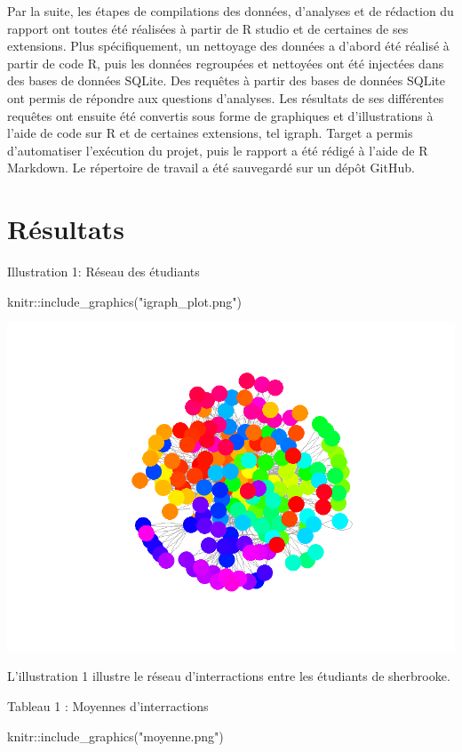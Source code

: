 \documentclass[9pt,twocolumn,twoside,]{pnas-new}
\newenvironment{Shaded}{\begin{snugshade}}{\end{snugshade}}
\newcommand{\FunctionTok}[1]{\textcolor[rgb]{0.00,0.00,0.00}{#1}}
\newcommand{\NormalTok}[1]{#1}
\newcommand{\SpecialCharTok}[1]{\textcolor[rgb]{0.00,0.00,0.00}{#1}}
\newcommand{\StringTok}[1]{\textcolor[rgb]{0.31,0.60,0.02}{#1}}
\begin{document}
Par la suite, les étapes de compilations des données, d'analyses et de
rédaction du rapport ont toutes été réalisées à partir de R studio et de
certaines de ses extensions. Plus spécifiquement, un nettoyage des
données a d'abord été réalisé à partir de code R, puis les données
regroupées et nettoyées ont été injectées dans des bases de données
SQLite. Des requêtes à partir des bases de données SQLite ont permis de
répondre aux questions d'analyses. Les résultats de ses différentes
requêtes ont ensuite été convertis sous forme de graphiques et
d'illustrations à l'aide de code sur R et de certaines extensions, tel
igraph. Target a permis d'automatiser l'exécution du projet, puis le
rapport a été rédigé à l'aide de R Markdown. Le répertoire de travail a
été sauvegardé sur un dépôt GitHub.

\hypertarget{ruxe9sultats}{%
\section{Résultats}\label{ruxe9sultats}}

Illustration 1: Réseau des étudiants

\begin{Shaded}
\begin{Highlighting}[]
\NormalTok{knitr}\SpecialCharTok{::}\FunctionTok{include\_graphics}\NormalTok{(}\StringTok{"igraph\_plot.png"}\NormalTok{)}
\end{Highlighting}
\end{Shaded}

\includegraphics[width=0.5\linewidth]{igraph_plot}

L'illustration 1 illustre le réseau d'interractions entre les étudiants
de sherbrooke.

Tableau 1 : Moyennes d'interractions

\begin{Shaded}
\begin{Highlighting}[]
\NormalTok{knitr}\SpecialCharTok{::}\FunctionTok{include\_graphics}\NormalTok{(}\StringTok{"moyenne.png"}\NormalTok{)}
\end{Highlighting}
\end{Shaded}
\end{document}
